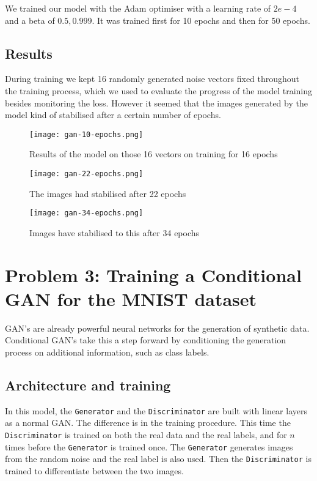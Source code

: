 \documentclass[12pt]{scrartcl}
\begin{document}
    We trained our model with the Adam optimiser with a learning rate of \(2e-4\) and a beta of \(0.5, 0.999\). It was trained first for 10 epochs and then for 50 epochs.

    \subsection{Results}

    During training we kept 16 randomly generated noise vectors fixed throughout the training process, which we used to evaluate the progress of the model training besides monitoring the loss. However it seemed that the images generated by the model kind of stabilised after a certain number of epochs.

    \begin{center}
        \begin{figure}[H]
            \texttt{[image: gan-10-epochs.png]}
            \caption{Results of the model on those 16 vectors on training for 16 epochs}
        \end{figure}

        \begin{figure}[H]
            \texttt{[image: gan-22-epochs.png]}
            \caption{The images had stabilised after 22 epochs}
        \end{figure}

        \begin{figure}[H]
            \texttt{[image: gan-34-epochs.png]}
            \caption{Images have stabilised to this after 34 epochs}
        \end{figure}
    \end{center}

    \section{Problem 3: Training a Conditional GAN for the MNIST dataset}

    GAN's are already powerful neural networks for the generation of synthetic data. Conditional GAN's take this a step forward by conditioning the generation process on additional information, such as class labels.

    \subsection{Architecture and training}

    In this model, the \texttt{Generator} and the \texttt{Discriminator} are built with linear layers as a normal GAN. The difference is in the training procedure. This time the \texttt{Discriminator} is trained on both the real data and the real labels, and for \(n\) times before the \texttt{Generator} is trained once. The \texttt{Generator} generates images from the random noise and the real label is also used. Then the \texttt{Discriminator} is trained to differentiate between the two images.
\end{document}
